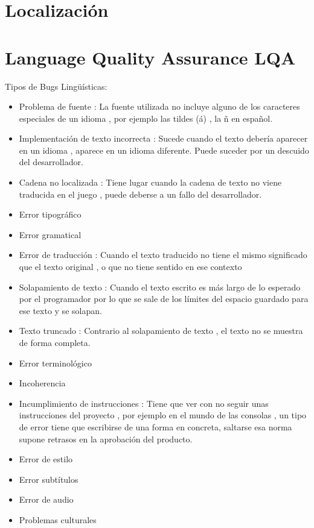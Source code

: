 \section{Localización}
\section{Language Quality Assurance LQA }
Tipos de Bugs Lingüísticas:
\begin{itemize}
	\item Problema de fuente : La fuente utilizada no incluye alguno de los caracteres especiales de un idioma , por ejemplo las tildes (á) , la ñ en español.
	\item Implementación de texto incorrecta : Sucede cuando el texto debería aparecer en un idioma , aparece en un idioma diferente. Puede suceder por un descuido del desarrollador.
	
	\item Cadena no localizada : 
	Tiene lugar cuando la cadena de texto no viene traducida en el juego , puede deberse a un fallo del desarrollador.
	
	\item Error tipográfico
	\item Error gramatical
	\item Error de traducción : Cuando el texto traducido no tiene el mismo significado que el texto original , o que no tiene sentido en ese contexto
	
	\item Solapamiento de texto : Cuando el texto escrito es más largo de lo esperado por el programador por lo que se sale de los límites del espacio guardado para ese texto y se solapan. 
	
	
	\item Texto truncado : Contrario al solapamiento de texto , el texto no se muestra de forma completa.
	
	
	\item Error terminológico
	\item Incoherencia
	\item Incumplimiento de instrucciones : Tiene que ver con no seguir unas instrucciones del proyecto , por ejemplo en el mundo de las consolas , un tipo de error tiene que escribirse de una forma en concreta, saltarse esa norma supone retrasos en la aprobación del producto.
	
	\item Error de estilo
	\item Error subtítulos
	\item Error de audio
	\item Problemas culturales
\end{itemize}
